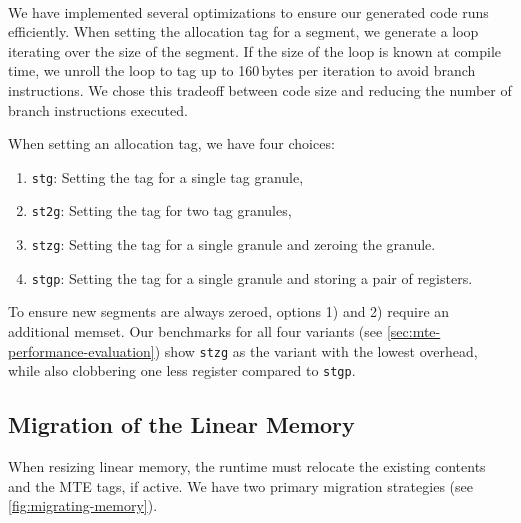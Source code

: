 \paragraph{}
We have implemented several optimizations to ensure our generated code runs efficiently.
When setting the allocation tag for a segment, we generate a loop iterating over the size of the segment.
If the size of the loop is known at compile time, we unroll the loop to tag up to 160\,bytes per iteration to avoid branch instructions.
We chose this tradeoff between code size and reducing the number of branch instructions executed.

When setting an allocation tag, we have four choices:
\begin{enumerate}
  \item \texttt{stg}: Setting the tag for a single tag granule,
  \item \texttt{st2g}: Setting the tag for two tag granules,
  \item \texttt{stzg}: Setting the tag for a single granule and zeroing the granule.
  \item \texttt{stgp}: Setting the tag for a single granule and storing a pair of registers.
\end{enumerate}

To ensure new segments are always zeroed, options 1) and 2) require an additional memset.
Our benchmarks for all four variants (see \cref{sec:mte-performance-evaluation}) show \texttt{stzg} as the variant with the lowest overhead, while also clobbering one less register compared to \texttt{stgp}.

\subsection{Migration of the Linear Memory}
\label{subsec:migration-of-the-linear-memory}

When resizing linear memory, the runtime must relocate the existing contents and the \ac{MTE} tags, if active.
We have two primary migration strategies (see \cref{fig:migrating-memory}).

